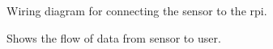 \begin{figure}[H]
    \centering
    \caption{\label{fig:rpi_wiring} Wiring diagram for connecting the sensor to the \gls{rpi}.}
\end{figure}

\begin{figure}[H]
    \centering
    \caption{\label{fig:data_flow} Shows the flow of data from sensor to user.}
\end{figure}
